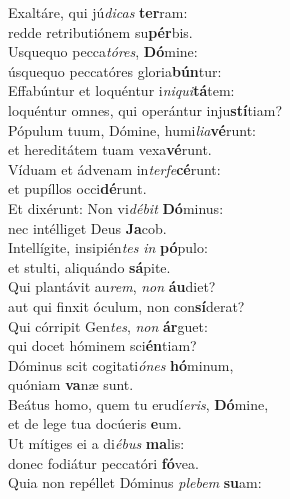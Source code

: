 \evenverse Exaltáre, qui jú\textit{di}\textit{cas} \textbf{ter}ram:~\*\\
\evenverse redde retributiónem su\textbf{pér}bis.\\
\oddverse Usquequo pecca\textit{tó}\textit{res}, \textbf{Dó}mine:~\*\\
\oddverse úsquequo peccatóres gloria\textbf{bún}tur:\\
\evenverse Effabúntur et loquéntur i\textit{ni}\textit{qui}\textbf{tá}tem:~\*\\
\evenverse loquéntur omnes, qui operántur inju\textbf{stí}tiam?\\
\oddverse Pópulum tuum, Dómine, humi\textit{li}\textit{a}\textbf{vé}runt:~\*\\
\oddverse et hereditátem tuam vexa\textbf{vé}runt.\\
\evenverse Víduam et ádvenam in\textit{ter}\textit{fe}\textbf{cé}runt:~\*\\
\evenverse et pupíllos occi\textbf{dé}runt.\\
\oddverse Et dixérunt: Non vi\textit{dé}\textit{bit} \textbf{Dó}minus:~\*\\
\oddverse nec intélliget Deus \textbf{Ja}cob.\\
\evenverse Intellígite, insipién\textit{tes} \textit{in} \textbf{pó}pulo:~\*\\
\evenverse et stulti, aliquándo \textbf{sá}pite.\\
\oddverse Qui plantávit au\textit{rem}, \textit{non} \textbf{áu}diet?~\*\\
\oddverse aut qui finxit óculum, non con\textbf{sí}derat?\\
\evenverse Qui córripit Gen\textit{tes}, \textit{non} \textbf{ár}guet:~\*\\
\evenverse qui docet hóminem sci\textbf{én}tiam?\\
\oddverse Dóminus scit cogitati\textit{ó}\textit{nes} \textbf{hó}minum,~\*\\
\oddverse quóniam \textbf{va}næ sunt.\\
\evenverse Beátus homo, quem tu erudí\textit{e}\textit{ris}, \textbf{Dó}mine,~\*\\
\evenverse et de lege tua docúeris \textbf{e}um.\\
\oddverse Ut mítiges ei a di\textit{é}\textit{bus} \textbf{ma}lis:~\*\\
\oddverse donec fodiátur peccatóri \textbf{fó}vea.\\
\evenverse Quia non repéllet Dóminus \textit{ple}\textit{bem} \textbf{su}am:~\*\\
